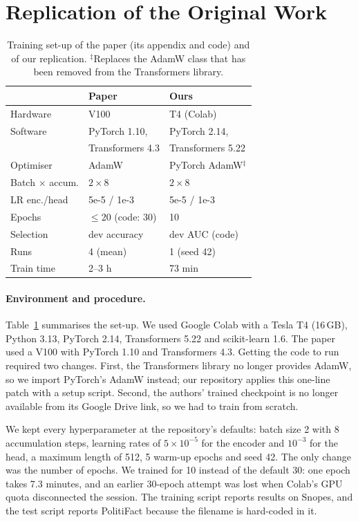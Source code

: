 \documentclass[11pt]{article}
\begin{document}
\section{Replication of the Original Work}
\label{sec:replication}

\begin{table}[t]
\centering\small
\setlength{\tabcolsep}{3pt}
\footnotesize\begin{tabular}{lll}
\toprule
 & Paper & Ours \\
\midrule
Hardware & V100 & T4 (Colab) \\
Software & PyTorch 1.10, & PyTorch 2.14, \\
 & Transformers 4.3 & Transformers 5.22 \\
Optimiser & AdamW & PyTorch AdamW$^\ddagger$ \\
Batch $\times$ accum. & $2\times8$ & $2\times8$ \\
LR enc./head & 5e-5 / 1e-3 & 5e-5 / 1e-3 \\
Epochs & $\le$20 (code: 30) & 10 \\
Selection & dev accuracy & dev AUC (code) \\
Runs & 4 (mean) & 1 (seed 42) \\
Train time & 2--3 h & 73 min \\
\bottomrule
\end{tabular}
\caption{Training set-up of the paper (its appendix and code) and of our replication. $^\ddagger$Replaces the AdamW class that has been removed from the Transformers library.}
\label{tab:env}
\end{table}

\paragraph{Environment and procedure.} Table~\ref{tab:env} summarises the set-up. We used Google Colab with a Tesla T4 (16\,GB), Python 3.13, PyTorch 2.14, Transformers 5.22 and scikit-learn 1.6. The paper used a V100 with PyTorch 1.10 and Transformers 4.3. Getting the code to run required two changes. First, the Transformers library no longer provides AdamW, so we import PyTorch's AdamW instead; our repository applies this one-line patch with a setup script. Second, the authors' trained checkpoint is no longer available from its Google Drive link, so we had to train from scratch.

We kept every hyperparameter at the repository's defaults: batch size 2 with 8 accumulation steps, learning rates of $5\times10^{-5}$ for the encoder and $10^{-3}$ for the head, a maximum length of 512, 5 warm-up epochs and seed 42. The only change was the number of epochs. We trained for 10 instead of the default 30: one epoch takes 7.3 minutes, and an earlier 30-epoch attempt was lost when Colab's GPU quota disconnected the session. The training script reports results on Snopes, and the test script reports PolitiFact because the filename is hard-coded in it.
\end{document}
